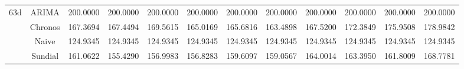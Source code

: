 \begin{table}[h!]
{\begin{tabular}{cccccccccccc}
\midrule
\multirow[c]{4}{*}{63d} & ARIMA & 200.0000 & 200.0000 & 200.0000 & 200.0000 & 200.0000 & 200.0000 & 200.0000 & 200.0000 & 200.0000 & 200.0000 \\
 & Chronos & 167.3694 & 167.4494 & 169.5615 & 165.0169 & 165.6816 & 163.4898 & 167.5200 & 172.3849 & 175.9508 & 178.9842 \\
 & Naive & 124.9345 & 124.9345 & 124.9345 & 124.9345 & 124.9345 & 124.9345 & 124.9345 & 124.9345 & 124.9345 & 124.9345 \\
 & Sundial & 161.0622 & 155.4290 & 156.9983 & 156.8283 & 159.6097 & 159.0567 & 164.0014 & 163.3950 & 161.8009 & 168.7781 \\
\bottomrule
\end{tabular}

 }
\end{table}